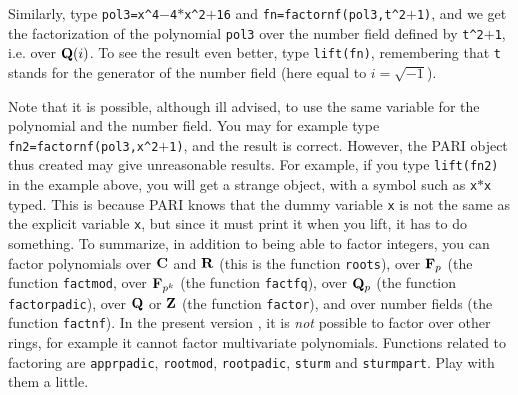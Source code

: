 Similarly, type {\tt pol3=x\^{}4$-$4$*$x\^{}2$+$16} and
{\tt fn=factornf(pol3,t\^{}2$+$1)}, and we get the factorization of the 
polynomial {\tt pol3} over the number field defined by {\tt t\^{}2$+$1},
i.e. over ${\bf Q}(i)$. To see the result even better, type {\tt lift(fn)},
remembering that {\tt t} stands for the generator of the number field
(here equal to $i=\sqrt{-1}$). 

Note that it is possible, although ill advised, to use the same variable
for the polynomial and the number field. You may for example type
{\tt fn2=factornf(pol3,x\^{}2$+$1)}, and the result is correct. However,
the PARI object thus created may give unreasonable results. For example,
if you type {\tt lift(fn2)} in the example above, you will get a strange
object, with a symbol such as {\tt x$*$x} typed. This is because
PARI knows that the dummy variable {\tt x} is not the same as the explicit
variable {\tt x}, but since it must print it when you lift, it has to
do something.
\smallskip
To summarize, in addition to being able to factor integers, you can
factor polynomials over ${\bf C}$ and ${\bf R}$ (this is the function {\tt roots}),
over ${\bf F}_p$ (the function {\tt factmod}, over ${\bf F}_{p^k}$ (the function
{\tt factfq}), over ${\bf Q}_p$ (the function {\tt factorpadic}), over ${\bf Q}$ or
${\bf Z}$ (the function {\tt factor}), and over number fields (the function
{\tt factnf}). In the present version \vers{}, it is {\it not} possible to
factor over other rings, for example it cannot factor multivariate polynomials.
\smallskip
Functions related to factoring are {\tt apprpadic}, {\tt rootmod}, 
{\tt rootpadic}, {\tt sturm} and {\tt sturmpart}. Play with them a little.

